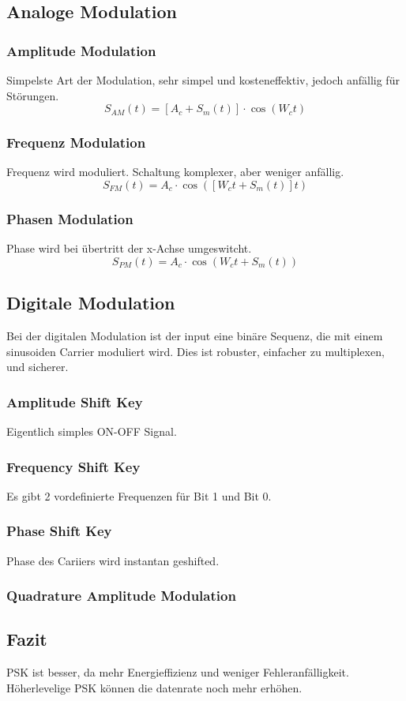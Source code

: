 \documentclass[a4paper]{article}
\begin{document}
\subsection{Analoge Modulation}
\subsubsection{Amplitude Modulation}
Simpelste Art der Modulation, sehr simpel und kosteneffektiv, jedoch anfällig für Störungen.
$$S_{AM}(t)=[A_c+S_m(t)]\cdot\cos(W_c t)$$ 
\subsubsection{Frequenz Modulation}
Frequenz wird moduliert. Schaltung komplexer, aber weniger anfällig.
$$S_{FM}(t)=A_c\cdot\cos([W_c t + S_m(t)]t)$$
\subsubsection{Phasen Modulation}
Phase wird bei übertritt der x-Achse umgeswitcht.
$$S_{PM}(t)=A_c\cdot\cos(W_c t + S_m(t))$$
\subsection{Digitale Modulation}
Bei der digitalen Modulation ist der input eine binäre Sequenz, die mit einem sinusoiden Carrier moduliert wird. Dies ist robuster, einfacher zu multiplexen, und sicherer.
\subsubsection{Amplitude Shift Key}
Eigentlich simples ON-OFF Signal.
\subsubsection{Frequency Shift Key}
Es gibt 2 vordefinierte Frequenzen für Bit 1 und Bit 0.
\subsubsection{Phase Shift Key}
Phase des Cariiers wird instantan geshifted. 
\subsubsection{Quadrature Amplitude Modulation}
\subsection{Fazit}
PSK ist besser, da mehr Energieffizienz und weniger Fehleranfälligkeit. Höherlevelige PSK können die datenrate noch mehr erhöhen.
\newpage
\end{document}
